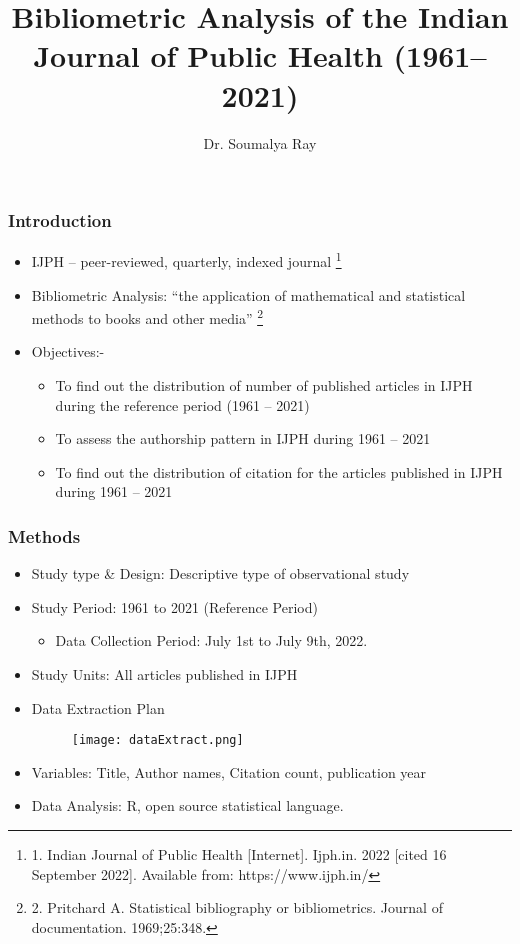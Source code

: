 \documentclass[14pt, aspectratio=169]{beamer}
\title[Bibliometric Analysis IJPH]{Bibliometric Analysis of the Indian Journal of Public Health (1961–2021) }
\author[Dr Soumalya Ray]{Dr. Soumalya Ray}
\institute[ ]{  Assistant Professor \\
Department of Community Medicine \\
College of Medicine and Sagore Dutta Hospital \\
Kamarhati, Kolkata - 700058}
\date{}
\begin{document}
\maketitle

\begin{frame}
\frametitle{Introduction}
\begin{itemize}
  \item IJPH – peer-reviewed, quarterly, indexed journal \footnote{1. Indian Journal of Public Health [Internet]. Ijph.in. 2022 [cited 16 September 2022]. Available from: https://www.ijph.in/}
  \item Bibliometric Analysis: “the application of mathematical and statistical methods to books and other media” \footnote{2. Pritchard A. Statistical bibliography or bibliometrics. Journal of documentation. 1969;25:348.}
  \item Objectives:- 
  \begin{itemize}
    \item To find out the distribution of number of published articles in IJPH during the reference period (1961 – 2021) 
    \item To assess the authorship pattern in IJPH during 1961 – 2021 
    \item To find out the distribution of citation for the articles published in IJPH during 1961 – 2021 
  \end{itemize}
\end{itemize}
  
\end{frame}

\begin{frame}
  \frametitle{Methods}
  \begin{itemize}
    \item Study type \& Design: Descriptive type of observational study 
    \item Study Period: 1961 to 2021 (Reference Period)
    \begin{itemize}
      \item Data Collection Period: July 1st to July 9th, 2022. 
    \end{itemize}
    \item Study Units: All articles published in IJPH
    \item Data Extraction Plan
    \begin{figure}
      \texttt{[image: dataExtract.png]}
    \end{figure}
    \item Variables: Title, Author names, Citation count, publication year
    \item Data Analysis: R, open source statistical language.  
  \end{itemize}
\end{frame}
\end{document}
